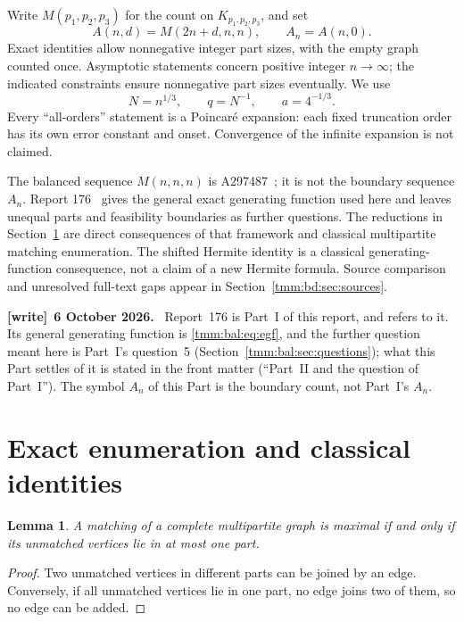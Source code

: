 \documentclass[11pt,letterpaper]{article}
\newtheorem{lemma}[theorem]{Lemma}
\theoremstyle{remark}\newtheorem{remark}[theorem]{Remark}
\newenvironment{writenote}[1][]{\par\smallskip\begingroup\small
 \noindent\textbf{[write]}\if\relax\detokenize{#1}\relax\else~\textbf{#1.}\fi\ }%
 {\par\endgroup\smallskip}
\begin{document}
Write $M(p_1,p_2,p_3)$ for the count on $K_{p_1,p_2,p_3}$, and set
\[
 A(n,d)=M(2n+d,n,n),\qquad A_n=A(n,0).
\]
Exact identities allow nonnegative integer part sizes, with the empty graph counted once. Asymptotic statements concern positive integer $n\to\infty$; the indicated constraints ensure nonnegative part sizes eventually. We use
\[
 N=n^{1/3},\qquad q=N^{-1},\qquad a=4^{-1/3}.
\]
Every ``all-orders'' statement is a Poincar\'e expansion: each fixed truncation order has its own error constant and onset. Convergence of the infinite expansion is not claimed.

The balanced sequence $M(n,n,n)$ is A297487~\cite{oeis}; it is not the boundary sequence $A_n$. Report 176~\cite{r176} gives the general exact generating function used here and leaves unequal parts and feasibility boundaries as further questions. The reductions in Section~\ref{tmm:bd:sec:exact} are direct consequences of that framework and classical multipartite matching enumeration. The shifted Hermite identity is a classical generating-function consequence, not a claim of a new Hermite formula. Source comparison and unresolved full-text gaps appear in Section~\ref{tmm:bd:sec:sources}.
\begin{writenote}[6 October 2026]
Report~176 is Part~I of this report, and \cite{r176} refers to it. Its general generating function is \eqref{tmm:bal:eq:egf}, and the further question meant here is Part~I's question~5 (Section~\ref{tmm:bal:sec:questions}); what this Part settles of it is stated in the front matter (``Part~II and the question of Part~I''). The symbol $A_n$ of this Part is the boundary count, not Part~I's $A_n$.
\end{writenote}

\section{Exact enumeration and classical identities}\label{tmm:bd:sec:exact}
\begin{lemma}\label{tmm:bd:lem:maximal}
A matching of a complete multipartite graph is maximal if and only if its unmatched vertices lie in at most one part.
\end{lemma}
\begin{proof}
Two unmatched vertices in different parts can be joined by an edge. Conversely, if all unmatched vertices lie in one part, no edge joins two of them, so no edge can be added.
\end{proof}
\end{document}
